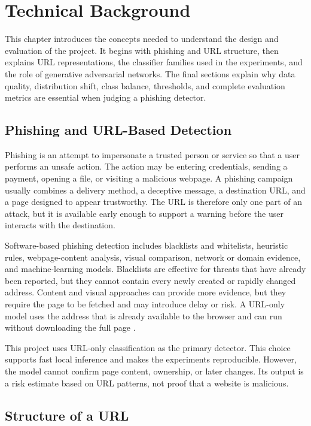 \chapter{Technical Background}
\label{chapter:background}

This chapter introduces the concepts needed to understand the design and
evaluation of the project. It begins with phishing and URL structure, then
explains URL representations, the classifier families used in the experiments,
and the role of generative adversarial networks. The final sections explain why
data quality, distribution shift, class balance, thresholds, and complete
evaluation metrics are essential when judging a phishing detector.

\section{Phishing and URL-Based Detection}

Phishing is an attempt to impersonate a trusted person or service so that a user
performs an unsafe action. The action may be entering credentials, sending a
payment, opening a file, or visiting a malicious webpage. A phishing campaign
usually combines a delivery method, a deceptive message, a destination URL, and
a page designed to appear trustworthy. The URL is therefore only one part of an
attack, but it is available early enough to support a warning before the user
interacts with the destination.

Software-based phishing detection includes blacklists and whitelists, heuristic
rules, webpage-content analysis, visual comparison, network or domain evidence,
and machine-learning models. Blacklists are effective for threats that have
already been reported, but they cannot contain every newly created or rapidly
changed address. Content and visual approaches can provide more evidence, but
they require the page to be fetched and may introduce delay or risk. A URL-only
model uses the address that is already available to the browser and can run
without downloading the full page \citep{alahmadi2022pdgan,alalyan2020robust}.

This project uses URL-only classification as the primary detector. This choice
supports fast local inference and makes the experiments reproducible. However,
the model cannot confirm page content, ownership, or later changes. Its output
is a risk estimate based on URL patterns, not proof that a website is malicious.

\section{Structure of a URL}

